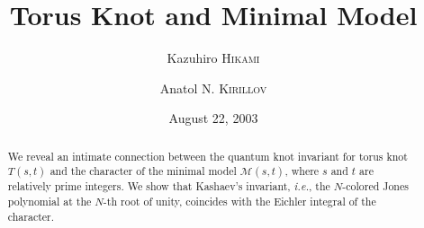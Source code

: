 \documentclass[12pt,reqno]{amsart}
\begin{document}
\baselineskip 16.8pt
\parskip 7pt



\title{
  Torus Knot and Minimal Model
}



    \author{Kazuhiro \textsc{Hikami}}
    



  \address{Department of Physics, Graduate School of Science,
    University of Tokyo,
    Hongo 7--3--1, Bunkyo, Tokyo 113--0033, Japan.
    }


    

    \author{Anatol N. \textsc{Kirillov}}
    \address{RIMS, Kyoto University,  Kyoto 606-8502, Japan.}









\date{August 22, 2003}



\begin{abstract}
  We reveal an intimate connection between the quantum knot invariant
  for torus knot $T(s,t)$ and the  character of the minimal
  model $\mathcal{M}(s,t)$, where $s$ and $t$ are relatively prime
  integers.
  We show that
  Kashaev's invariant,
  \emph{i.e.},  the $N$-colored Jones polynomial  at the $N$-th root
  of unity,
  coincides with the Eichler integral of the
  character.
\end{abstract}




\end{document}
